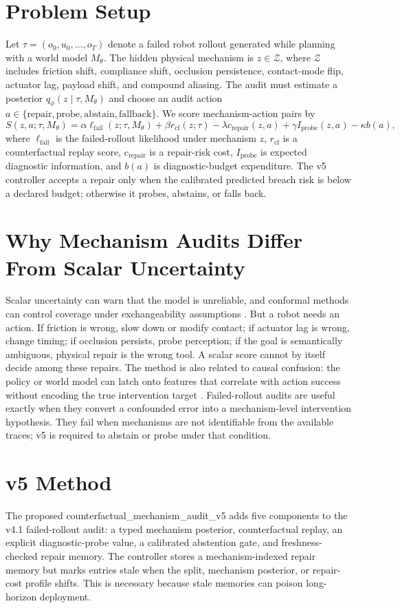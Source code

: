 \documentclass{article}
\begin{document}
\section{Problem Setup}
Let $\tau=(o_0,u_0,\ldots,o_T)$ denote a failed robot rollout generated while planning with a world model $M_\theta$. The hidden physical mechanism is $z\in\mathcal{Z}$, where $\mathcal{Z}$ includes friction shift, compliance shift, occlusion persistence, contact-mode flip, actuator lag, payload shift, and compound aliasing. The audit must estimate a posterior $q_\phi(z\mid \tau,M_\theta)$ and choose an audit action $a\in\{\mathrm{repair},\mathrm{probe},\mathrm{abstain},\mathrm{fallback}\}$.
We score mechanism-action pairs by
\[
S(z,a;\tau,M_\theta)=\alpha \ell_{\mathrm{fail}}(z;\tau,M_\theta)+\beta r_{\mathrm{cf}}(z;\tau)-\lambda c_{\mathrm{repair}}(z,a)+\gamma I_{\mathrm{probe}}(z,a)-\kappa b(a),
\]
where $\ell_{\mathrm{fail}}$ is the failed-rollout likelihood under mechanism $z$, $r_{\mathrm{cf}}$ is a counterfactual replay score, $c_{\mathrm{repair}}$ is a repair-risk cost, $I_{\mathrm{probe}}$ is expected diagnostic information, and $b(a)$ is diagnostic-budget expenditure. The v5 controller accepts a repair only when the calibrated predicted breach risk is below a declared budget; otherwise it probes, abstains, or falls back.
\section{Why Mechanism Audits Differ From Scalar Uncertainty}
Scalar uncertainty can warn that the model is unreliable, and conformal methods can control coverage under exchangeability assumptions \citep{vovk2005conformal,angelopoulos2021gentle}. But a robot needs an action. If friction is wrong, slow down or modify contact; if actuator lag is wrong, change timing; if occlusion persists, probe perception; if the goal is semantically ambiguous, physical repair is the wrong tool. A scalar score cannot by itself decide among these repairs.
The method is also related to causal confusion: the policy or world model can latch onto features that correlate with action success without encoding the true intervention target \citep{dehaan2019causalconfusion}. Failed-rollout audits are useful exactly when they convert a confounded error into a mechanism-level intervention hypothesis. They fail when mechanisms are not identifiable from the available traces; v5 is required to abstain or probe under that condition.
\section{v5 Method}
The proposed counterfactual\_mechanism\_audit\_v5 adds five components to the v4.1 failed-rollout audit: a typed mechanism posterior, counterfactual replay, an explicit diagnostic-probe value, a calibrated abstention gate, and freshness-checked repair memory. The controller stores a mechanism-indexed repair memory but marks entries stale when the split, mechanism posterior, or repair-cost profile shifts. This is necessary because stale memories can poison long-horizon deployment.
\end{document}
